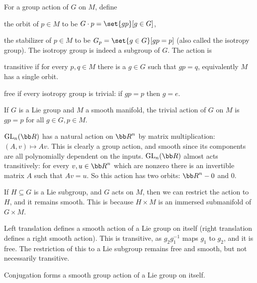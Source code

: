 \bdefn

    For a group action of $G$ on $M$, define
    \benum
        \item the {\emphcolor orbit} of $p\in M$ to be $G\cdot p=\set{gp}[g\in G]$,
        \item the {\emphcolor stabilizer} of $p\in M$ to be $G_p=\set{g\in G}[gp=p]$ (also called the {\emphcolor isotropy group}).
    \eenum
    The isotropy group is indeed a subgroup of $G$.
    The action is
    \benum
        \item {\emphcolor transitive} if for every $p,q\in M$ there is a $g\in G$ such that $gp=q$, equivalently $M$ has a single orbit.
        \item {\emphcolor free} if every isotropy group is trivial: if $gp=p$ then $g=e$.
    \eenum

\edefn

\bexam

    If $G$ is a Lie group and $M$ a smooth manifold, the {\emphcolor trivial action} of $G$ on $M$ is $gp=p$ for all $g\in G,p\in M$.

\eexam

\bexam

    $\gl_n(\bR)$ has a natural action on $\bR^n$ by matrix multiplication: $(A,v)\mapsto Av$.
    This is clearly a group action, and smooth since its components are all polynomially dependent on the inputs.
    $\gl_n(\bR)$ almost acts transitively: for every $v,u\in\bR^n$ which are nonzero there is an invertible matrix $A$ such that $Av=u$.
    So this action has two orbits: $\bR^n-0$ and $0$.

\eexam

If $H\subseteq G$ is a Lie subgroup, and $G$ acts on $M$, then we can restrict the action to $H$, and it remains smooth.
This is because $H\times M$ is an immersed submanifold of $G\times M$.

\bexam

    Left translation defines a smooth action of a Lie group on itself (right translation defines a right smooth action).
    This is transitive, as $g_2g_1^{-1}$ maps $g_1$ to $g_2$, and it is free.
    The restriction of this to a Lie subgroup remains free and smooth, but not necessarily transitive.

\eexam

\bexam

    Conjugation forms a smooth group action of a Lie group on itself.

\eexam

\bdefn

